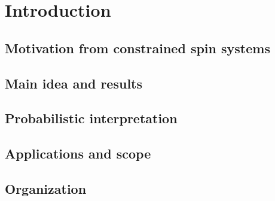 \section{Introduction}
\label{sec:introduction}

\subsection{Motivation from constrained spin systems}

\subsection{Main idea and results}

\subsection{Probabilistic interpretation}

\subsection{Applications and scope}

\subsection{Organization}
